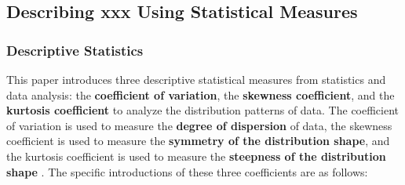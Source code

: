 \documentclass{article}
\begin{document}
	\subsection{Describing xxx Using Statistical Measures}
	
	\subsubsection{Descriptive Statistics}
	
	This paper introduces three descriptive statistical measures from statistics and data analysis: the \textbf{coefficient of variation}, the \textbf{skewness coefficient}, and the \textbf{kurtosis coefficient} to analyze the distribution patterns of data. The coefficient of variation is used to measure the \textbf{degree of dispersion} of data, the skewness coefficient is used to measure the \textbf{symmetry of the distribution shape}, and the kurtosis coefficient is used to measure the \textbf{steepness of the distribution shape} \cite{1}. The specific introductions of these three coefficients are as follows:
	
\end{document}
